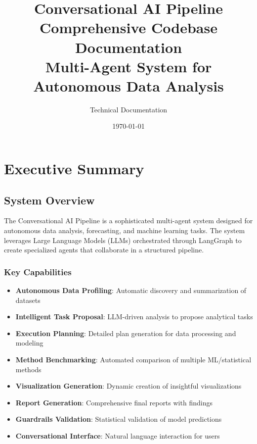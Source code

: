 \documentclass[12pt,a4paper]{report}
\title{
    \textbf{Conversational AI Pipeline} \\
    \Large Comprehensive Codebase Documentation \\
    \vspace{0.5cm}
    \normalsize Multi-Agent System for Autonomous Data Analysis
}
\author{Technical Documentation}
\date{\today}
\begin{document}
\maketitle
\tableofcontents
\newpage

\chapter{Executive Summary}

\section{System Overview}
The Conversational AI Pipeline is a sophisticated multi-agent system designed for autonomous data analysis, forecasting, and machine learning tasks. The system leverages Large Language Models (LLMs) orchestrated through LangGraph to create specialized agents that collaborate in a structured pipeline.

\subsection{Key Capabilities}
\begin{itemize}
    \item \textbf{Autonomous Data Profiling}: Automatic discovery and summarization of datasets
    \item \textbf{Intelligent Task Proposal}: LLM-driven analysis to propose analytical tasks
    \item \textbf{Execution Planning}: Detailed plan generation for data processing and modeling
    \item \textbf{Method Benchmarking}: Automated comparison of multiple ML/statistical methods
    \item \textbf{Visualization Generation}: Dynamic creation of insightful visualizations
    \item \textbf{Report Generation}: Comprehensive final reports with findings
    \item \textbf{Guardrails Validation}: Statistical validation of model predictions
    \item \textbf{Conversational Interface}: Natural language interaction for users
\end{itemize}
\end{document}
